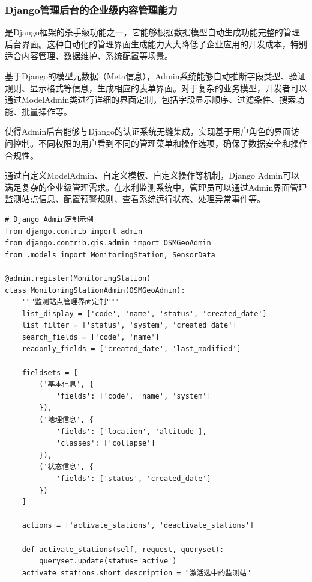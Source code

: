 \hypertarget{djangoux7ba1ux7406ux540eux53f0ux7684ux4f01ux4e1aux7ea7ux5185ux5bb9ux7ba1ux7406ux80fdux529b}{%
\subsubsection{Django管理后台的企业级内容管理能力}\label{djangoux7ba1ux7406ux540eux53f0ux7684ux4f01ux4e1aux7ea7ux5185ux5bb9ux7ba1ux7406ux80fdux529b}}

是Django框架的杀手级功能之一，它能够根据数据模型自动生成功能完整的管理后台界面。这种自动化的管理界面生成能力大大降低了企业应用的开发成本，特别适合内容管理、数据维护、系统配置等场景。

基于Django的模型元数据（Meta信息），Admin系统能够自动推断字段类型、验证规则、显示格式等信息，生成相应的表单界面。对于复杂的业务模型，开发者可以通过ModelAdmin类进行详细的界面定制，包括字段显示顺序、过滤条件、搜索功能、批量操作等。

使得Admin后台能够与Django的认证系统无缝集成，实现基于用户角色的界面访问控制。不同权限的用户看到不同的管理菜单和操作选项，确保了数据安全和操作合规性。

通过自定义ModelAdmin、自定义模板、自定义操作等机制，Django Admin可以满足复杂的企业级管理需求。在水利监测系统中，管理员可以通过Admin界面管理监测站点信息、配置预警规则、查看系统运行状态、处理异常事件等。

\begin{lstlisting}[style=python]
# Django Admin定制示例
from django.contrib import admin
from django.contrib.gis.admin import OSMGeoAdmin
from .models import MonitoringStation, SensorData

@admin.register(MonitoringStation)
class MonitoringStationAdmin(OSMGeoAdmin):
    """监测站点管理界面定制"""
    list_display = ['code', 'name', 'status', 'created_date']
    list_filter = ['status', 'system', 'created_date']
    search_fields = ['code', 'name']
    readonly_fields = ['created_date', 'last_modified']
    
    fieldsets = [
        ('基本信息', {
            'fields': ['code', 'name', 'system']
        }),
        ('地理信息', {
            'fields': ['location', 'altitude'],
            'classes': ['collapse']
        }),
        ('状态信息', {
            'fields': ['status', 'created_date']
        })
    ]
    
    actions = ['activate_stations', 'deactivate_stations']
    
    def activate_stations(self, request, queryset):
        queryset.update(status='active')
    activate_stations.short_description = "激活选中的监测站"
\end{lstlisting}

